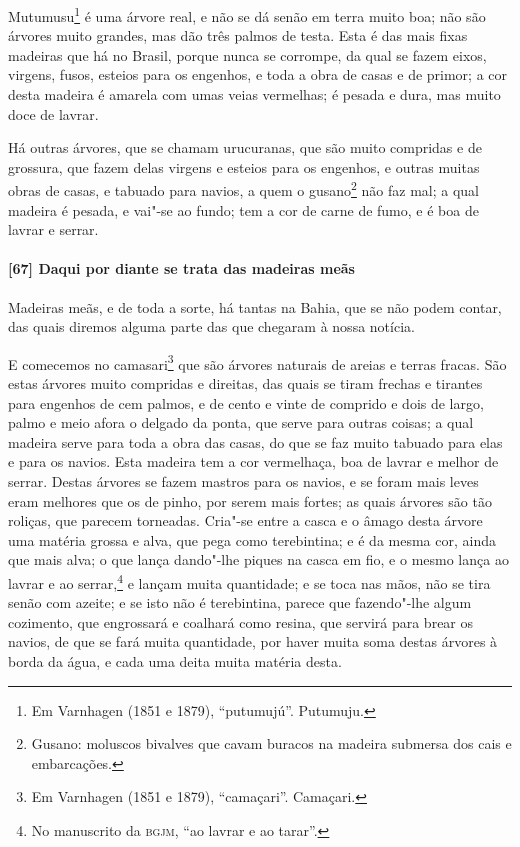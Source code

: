 Mutumusu\footnote{ Em Varnhagen (1851 e 1879), ``putumujú''. Putumuju.} é uma árvore real,
e não se dá senão em terra muito boa; não são árvores muito grandes, mas dão três palmos
de testa. Esta é das mais fixas madeiras que há no Brasil, porque nunca se corrompe, da
qual se fazem eixos, virgens, fusos, esteios para os engenhos, e toda a obra de casas e de
primor; a cor desta madeira é amarela com umas veias vermelhas; é pesada e dura, mas muito
doce de lavrar.

Há outras árvores, que se chamam urucuranas, que são muito compridas e de grossura, que
fazem delas virgens e esteios para os engenhos, e outras muitas obras de casas, e tabuado
para navios, a quem o gusano\footnote{ Gusano: moluscos bivalves que cavam buracos na
madeira submersa dos cais e embarcações.} não faz mal; a qual madeira é pesada, e vai"-se
ao fundo; tem a cor de carne de fumo, e é boa de lavrar e serrar.

\paragraph{[67] Daqui por diante se trata das madeiras meãs}\quad
Madeiras meãs, e de toda a sorte, há tantas na Bahia, que se não podem contar, das quais
diremos alguma parte das que chegaram à nossa notícia.

E comecemos no camasari\footnote{ Em Varnhagen (1851 e 1879), ``camaçari''. Camaçari.} que
são árvores naturais de areias e terras fracas. São estas árvores muito compridas e
direitas, das quais se tiram frechas e tirantes para engenhos de cem palmos, e de cento e
vinte de comprido e dois de largo, palmo e meio afora o delgado da ponta, que serve para
outras coisas; a qual madeira serve para toda a obra das casas, do que se faz muito
tabuado para elas e para os navios. Esta madeira tem a cor vermelhaça, boa de lavrar e
melhor de serrar. Destas árvores se fazem mastros para os navios, e se foram mais leves
eram melhores que os de pinho, por serem mais fortes; as quais árvores são tão roliças,
que parecem torneadas. Cria"-se entre a casca e o âmago desta árvore uma matéria grossa e
alva, que pega como terebintina; e é da mesma cor, ainda que mais alva; o que lança
dando"-lhe piques na casca em fio, e o mesmo lança ao lavrar e ao serrar,\footnote{ No
manuscrito da \textsc{bgjm}, ``ao lavrar e ao tarar''.} e lançam muita quantidade; e se
toca nas mãos, não se tira senão com azeite; e se isto não é terebintina, parece que
fazendo"-lhe algum cozimento, que engrossará e coalhará como resina, que servirá para brear
os navios, de que se fará muita quantidade, por haver muita soma destas árvores à borda da
água, e cada uma deita muita matéria desta.

